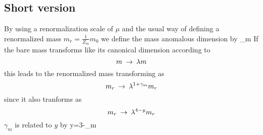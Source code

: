 \documentclass[a4,10pt,titlepage]{article}
\begin{document}
\subsection{Short version}
By using a renormalization scale of $\mu$ and the usual way of defining a renormalized mass $m_r=\frac{1}{Z_m}m_0$ we define the mass anomalous dimension by
\be
\gamma_m\equiv {}
\ee
If the  bare mass transforms like its canonical dimension according to
\[
m\:\rightarrow\: \lambda  m
\]
this leads to the renormalized mass transforming as
\[
m_r\:\rightarrow\: \lambda^{1+\gamma_m} m_r
\]
since it also tranforms as 
\[
m_r\:\rightarrow\: \lambda^{4-y}m_r
\]
$\gamma_m$ is related to $y$ by
\be
y=3-\gamma_m
\ee
\end{document}
